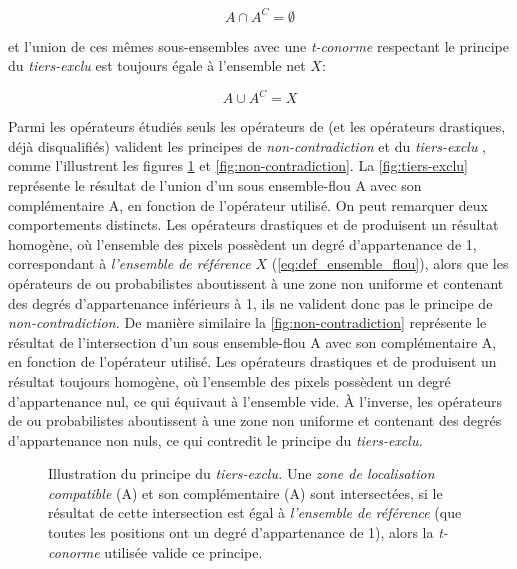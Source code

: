 \begin{equation}
  A \cap A^C = \emptyset
\end{equation}

et l'union de ces mêmes sous-ensembles avec une \emph{t-conorme}
respectant le principe du \emph{tiers-exclu} est toujours égale à
l'ensemble net \(X\):

\begin{equation}
  A \cup A^C = X
\end{equation}

Parmi les opérateurs étudiés seuls les opérateurs de 
(et les opérateurs drastiques, déjà disqualifiés) valident les
principes de \emph{non-contradiction} et du \emph{tiers-exclu}
\autocite{Bouchon-Meunier2007}, comme l'illustrent les figures
\ref{fig:tiers-exclu} et \ref{fig:non-contradiction}. La
\autoref{fig:tiers-exclu} représente le résultat de l'union d'un sous
ensemble-flou \textcolor{RdBu-9-1}{\textsf{A}} avec son complémentaire
\textcolor{RdBu-9-9}{\textsf{A}}, en fonction de l'opérateur
utilisé. On peut remarquer deux comportements distincts. Les
opérateurs drastiques et de  produisent un résultat
homogène, où l'ensemble des pixels possèdent un degré d'appartenance
de 1, correspondant à \emph{l'ensemble de référence} \(X\)
(\autoref{eq:def_ensemble_flou}), alors que les opérateurs de
 ou probabilistes aboutissent à une zone non uniforme et
contenant des degrés d'appartenance inférieurs à 1, ils ne valident
donc pas le principe de \emph{non-contradiction.} De manière similaire
la \autoref{fig:non-contradiction} représente le résultat de
l'intersection d'un sous ensemble-flou
\textcolor{RdBu-9-1}{\textsf{A}} avec son complémentaire
\textcolor{RdBu-9-9}{\textsf{A}}, en fonction de l'opérateur
utilisé. Les opérateurs drastiques et de  produisent
un résultat toujours homogène, où l'ensemble des pixels possèdent un
degré d'appartenance nul, ce qui équivaut à l'ensemble vide. À
l'inverse, les opérateurs de  ou probabilistes aboutissent
à une zone non uniforme et contenant des degrés d'appartenance non
nuls, ce qui contredit le principe du \emph{tiers-exclu.}

\begin{figure}
  \centering
  
  \caption[Illustration du principe du
  \emph{tiers-exclu}]{Illustration du principe du \emph{tiers-exclu.}
    Une \emph{zone de localisation compatible}
    (\textcolor{RdBu-9-1}{\textsf{A}}) et son complémentaire
    (\textcolor{RdBu-9-9}{\textsf{A}}) sont intersectées, si le
    résultat de cette intersection est égal à \emph{l'ensemble de
      référence} (\ie que toutes les positions ont un degré
    d'appartenance de 1), alors la \emph{t-conorme} utilisée valide ce
    principe.}
  \label{fig:tiers-exclu}
\end{figure}

